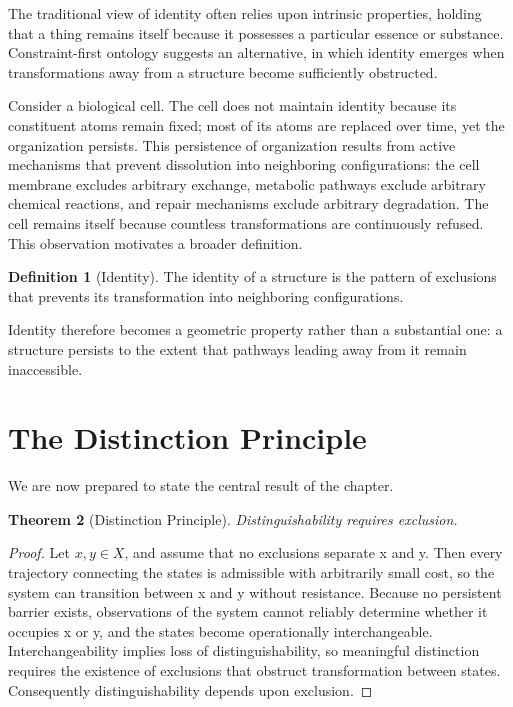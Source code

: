 \documentclass[11pt,oneside]{book}
\theoremstyle{plain}
\newtheorem{theorem}{Theorem}[chapter]
\theoremstyle{definition}
\newtheorem{definition}[theorem]{Definition}
\theoremstyle{remark}
\begin{document}
The traditional view of identity often relies upon intrinsic properties, holding that a thing remains itself because it possesses a particular essence or substance. Constraint-first ontology suggests an alternative, in which identity emerges when transformations away from a structure become sufficiently obstructed.

Consider a biological cell. The cell does not maintain identity because its constituent atoms remain fixed; most of its atoms are replaced over time, yet the organization persists. This persistence of organization results from active mechanisms that prevent dissolution into neighboring configurations: the cell membrane excludes arbitrary exchange, metabolic pathways exclude arbitrary chemical reactions, and repair mechanisms exclude arbitrary degradation. The cell remains itself because countless transformations are continuously refused. This observation motivates a broader definition.

\begin{definition}[Identity]
The identity of a structure is the pattern of exclusions that prevents its transformation into neighboring configurations.
\end{definition}

Identity therefore becomes a geometric property rather than a substantial one: a structure persists to the extent that pathways leading away from it remain inaccessible.

\section{The Distinction Principle}

We are now prepared to state the central result of the chapter.

\begin{theorem}[Distinction Principle]
Distinguishability requires exclusion.
\end{theorem}

\begin{proof}
Let \(x,y\in X\), and assume that no exclusions separate x and y. Then every trajectory connecting the states is admissible with arbitrarily small cost, so the system can transition between x and y without resistance. Because no persistent barrier exists, observations of the system cannot reliably determine whether it occupies x or y, and the states become operationally interchangeable. Interchangeability implies loss of distinguishability, so meaningful distinction requires the existence of exclusions that obstruct transformation between states. Consequently distinguishability depends upon exclusion.
\end{proof}
\end{document}
